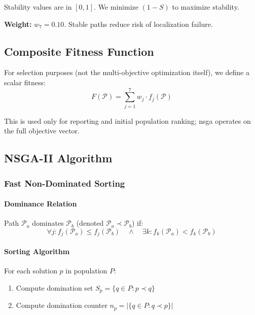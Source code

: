 Stability values are in $[0, 1]$. We minimize $(1 - S)$ to maximize stability.

\textbf{Weight:} $w_7 = 0.10$. Stable paths reduce risk of localization failure.

\subsection{Composite Fitness Function}

For selection purposes (not the multi-objective optimization itself), we define a scalar fitness:
\begin{equation}
F(\mathcal{P}) = \sum_{j=1}^{7} w_j \cdot f_j(\mathcal{P})
\label{eq:composite_fitness}
\end{equation}

This is used only for reporting and initial population ranking; \acrshort{nsga} operates on the full objective vector.

\subsection{NSGA-II Algorithm}

\subsubsection{Fast Non-Dominated Sorting}

\paragraph{Dominance Relation}
Path $\mathcal{P}_a$ dominates $\mathcal{P}_b$ (denoted $\mathcal{P}_a \prec \mathcal{P}_b$) if:
\begin{equation}
\forall j: f_j(\mathcal{P}_a) \leq f_j(\mathcal{P}_b) \quad \land \quad \exists k: f_k(\mathcal{P}_a) < f_k(\mathcal{P}_b)
\label{eq:dominance}
\end{equation}

\paragraph{Sorting Algorithm}
For each solution $p$ in population $P$:
\begin{enumerate}
    \item Compute domination set $S_p = \{q \in P : p \prec q\}$
    \item Compute domination counter $n_p = |\{q \in P : q \prec p\}|$
\end{enumerate}

